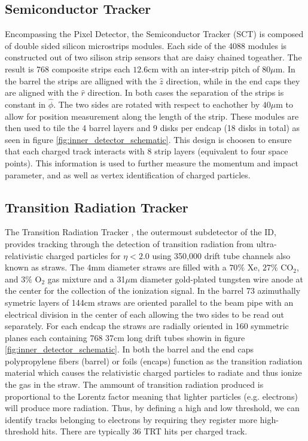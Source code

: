 \subsection{Semiconductor Tracker}

Encompassing the Pixel Detector, the Semiconductor Tracker (SCT) \cite{PERF-2007-01} is composed of
double sided silicon microstrips modules.  Each side of the 4088 modules is
constructed out of two silison strip sensors that are daisy chained togeather.
The result is 768 composite strips each $12.6$cm with an inter-strip pitch of
$80 \mu$m. In the barrel the strips are alligned with the $\hat{z}$ direction,
while in the end caps they are aligned with the $\hat{r}$ direction. In both
cases the separation of the strips is constant in $\hat{\phi}$. The two sides
are rotated with respect to eachother by $40 \mu$m to allow for position
measurement along the length of the strip.  These modules are then used to tile
the 4 barrel layers and 9 disks per endcap (18 disks in total) as seen in figure
\ref{fig:inner_detector_schematic}.  This design is choosen to ensure that each
charged track interacts with 8 strip layers (equivalent to four space points).
This information is used to further measure the momentum and impact parameter,
and as well as vertex identification of charged particles.

\subsection{Transition Radiation Tracker}

The Transition Radiation Tracker \cite{PERF-2007-01}, the outermoust subdetector
of the ID, provides tracking through the detection of transition radiation from
ultra-relativistic charged particles for $\eta < 2.0$ using 350,000 drift tube
channels also known as straws.  The 4mm diameter straws are filled with a $70\%$
Xe, $27\%$ CO$_2$, and $3\%$ O$_2$ gas mixture and a 31$\mu$m diameter
gold-plated tungsten wire anode at the center for the collection of the
ionization signal. In the barrel 73 azimuthally symetric layers of 144cm straws
are oriented parallel to the beam pipe with an electrical division in the center
of each allowing the two sides to be read out separately.  For each endcap the
straws are radially oriented in 160 symmetric planes each containing 768 37cm
long drift tubes showin in figure \ref{fig:inner_detector_schematic}.  In both
the barrel and the end caps polypropylene fibers (barrel) or foils (encaps)
function as the transition radiation material which causes the relativistic
charged particles to radiate and thus ionize the gas in the straw.  The ammount
of transition radiation produced is proportional to the Lorentz factor meaning
that lighter particles (e.g. electrons) will produce more radiation.  Thus, by
defining a high and low threshold, we can identify tracks belonging to electrons
by requiring they register more high-threshold hits. There are typically 36 TRT
hits per charged track. 
